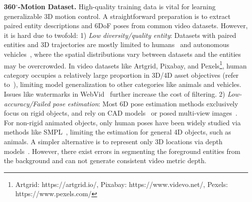 \noindent \textbf{360$^{\circ}$-Motion Dataset.} 
High-quality training data is vital for learning generalizable 3D motion control. A straightforward preparation is to extract paired entity descriptions and 6DoF poses from common video datasets. However, it is hard due to twofold: 1) \textit{Low diversity/quality entity}:  Datasets with paired entities and 3D trajectories are mostly limited to humans~\citep{jiang2024scaling,araujo2023circle} and autonomous vehicles~\citep{geiger2012we,sun2020scalability}, where the spatial distributions vary between datasets and the entities may be overcrowded. In video datasets like Artgrid, Pixabay, and Pexels\footnote{Artgrid: https://artgrid.io/, Pixabay: https://www.videvo.net/, Pexels: https://www.pexels.com/}, human category occupies a relatively large proportion in 3D/4D asset objectives (refer to~), limiting model generalization to other categories like animals and vehicles. Issues like watermarks in WebVid~\citep{bain2021frozen} further increase the cost of filtering. 2) \textit{Low-accuracy/Failed pose estimation}: Most 6D pose estimation methods exclusively focus on rigid objects, and rely on CAD models~\citep{labbe2022megapose,wen2024foundationpose} or posed multi-view images~\citep{liu2022gen6d,sun2022onepose}. For non-rigid animated objects, only human poses have been widely studied via methods like SMPL~\citep{loper2023smpl}, limiting the estimation for general 4D objects, such as animals. A simpler alternative is to represent only 3D locations via depth models~\citep{hu2024depthcrafter,ke2024video,fu2025geowizard}. However, there exist errors in segmenting the foreground entities from the background and can not generate consistent video metric depth.

